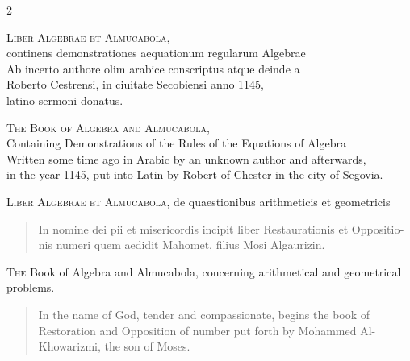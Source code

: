 \documentclass[11pt,a4paper,twoside]{book}
\newcommand{\latincolumn}[1]{\textlatin{\small #1}}
\newcommand{\englishcolumn}[1]{\small #1}
\begin{document}
\begin{paracol}{2}

\begin{center}
\textsc{Liber Algebrae et Almucabola,}\\[0.2cm]
\small continens demonstrationes aequationum regularum Algebrae\\[0.3cm]
\footnotesize Ab incerto authore olim arabice conscriptus atque deinde a\\
\footnotesize Roberto Cestrensi, in ciuitate Secobiensi anno 1145,\\
\footnotesize latino sermoni donatus.
\end{center}

\switchcolumn

\begin{center}
\textsc{The Book of Algebra and Almucabola,}\\[0.2cm]
\small Containing Demonstrations of the Rules of the Equations of Algebra\\[0.3cm]
\footnotesize Written some time ago in Arabic by an unknown author and afterwards,\\
\footnotesize in the year 1145, put into Latin by Robert of Chester in the city of Segovia.
\end{center}

\switchcolumn*

\noindent\textsc{Liber Algebrae et Almucabola,} de quaestionibus arithmeticis et geometricis

\begin{quote}
\latincolumn{In nomine dei pii et misericordis incipit liber Restaurationis et Oppositionis numeri quem aedidit Mahomet, filius Mosi Algaurizin.}
\end{quote}

\switchcolumn

\lettrine[lines=3]{T}{he} Book of Algebra and Almucabola, concerning arithmetical and geometrical problems.

\begin{quote}
\englishcolumn{In the name of God, tender and compassionate, begins the book of Restoration and Opposition of number put forth by Mohammed Al-Khowarizmi, the son of Moses.}
\end{quote}


\end{paracol}
\end{document}
